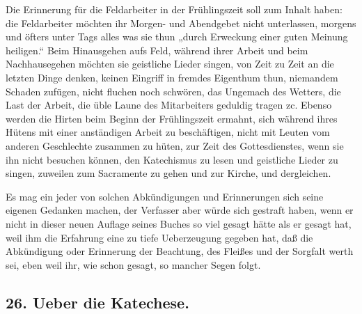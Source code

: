 Die Erinnerung für die Feldarbeiter in der Frühlingszeit soll zum Inhalt haben: die Feldarbeiter möchten ihr Morgen- und Abendgebet nicht unterlassen, morgens und öfters unter Tags alles was sie thun „durch Erweckung einer guten Meinung heiligen.“ Beim Hinausgehen aufs Feld, während ihrer Arbeit und beim Nachhausegehen möchten sie geistliche Lieder singen, von Zeit zu Zeit an die letzten Dinge denken, keinen Eingriff in fremdes Eigenthum thun, niemandem Schaden zufügen, nicht fluchen noch schwören, das Ungemach des Wetters, die Last der Arbeit, die üble Laune des Mitarbeiters geduldig tragen zc. Ebenso werden die Hirten beim Beginn der Frühlingszeit ermahnt, sich während ihres Hütens mit einer anständigen Arbeit zu beschäftigen, nicht mit Leuten vom anderen
Geschlechte zusammen zu hüten, zur Zeit des Gottesdienstes, wenn sie ihn nicht besuchen können, den Katechismus zu lesen und geistliche Lieder zu singen, zuweilen zum Sacramente zu gehen und zur Kirche, und dergleichen.

Es mag ein jeder von solchen Abkündigungen und Erinnerungen sich seine eigenen Gedanken machen, der Verfasser aber würde sich gestraft haben, wenn er nicht in dieser neuen Auflage seines Buches so viel gesagt hätte als er gesagt hat, weil ihm die Erfahrung eine zu tiefe Ueberzeugung gegeben hat, daß die Abkündigung oder Erinnerung der Beachtung, des Fleißes und der Sorgfalt werth sei, eben weil ihr, wie schon gesagt, so mancher Segen folgt.

\subsection*{26. Ueber die Katechese.}


